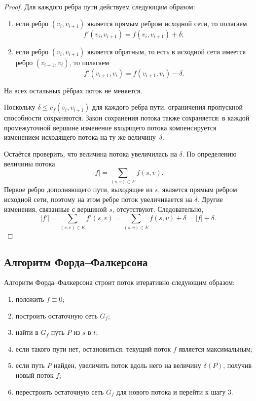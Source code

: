 \begin{proof}
	Для каждого ребра пути действуем следующим образом:
	\begin{enumerate}[label=\arabic*)]
		\item если ребро $(v_i,v_{i+1})$ является прямым ребром исходной сети, то полагаем
		\[
		f'(v_i,v_{i+1})=f(v_i,v_{i+1})+\delta;
		\]
		\item если ребро $(v_i,v_{i+1})$ является обратным, то есть в исходной сети имеется ребро $(v_{i+1},v_i)$, то полагаем
		\[
		f'(v_{i+1},v_i)=f(v_{i+1},v_i)-\delta.
		\]
	\end{enumerate}
	На всех остальных рёбрах поток не меняется.
	
	Поскольку $\delta \le c_f(v_i,v_{i+1})$ для каждого ребра пути, ограничения пропускной способности сохраняются. Закон сохранения потока также сохраняется: в каждой промежуточной вершине изменение входящего потока компенсируется изменением исходящего потока на ту же величину~$\delta$.
	
	Остаётся проверить, что величина потока увеличилась на $\delta$. По определению величины потока
	\[
	|f|=\sum_{(s,v)\in E} f(s,v).
	\]
	Первое ребро дополняющего пути, выходящее из $s$, является прямым ребром исходной сети, поэтому на этом ребре поток увеличивается на $\delta$. Другие изменения, связанные с вершиной $s$, отсутствуют. Следовательно,
	\[
	|f'|=\sum_{(s,v)\in E} f'(s,v)=\sum_{(s,v)\in E} f(s,v)+\delta=|f|+\delta.
	\]
\end{proof}

\subsection{Алгоритм Форда--Фалкерсона}

\begin{Statement}{}{}
	Алгоритм Форда--Фалкерсона строит поток итеративно следующим образом:
	\begin{enumerate}[label=\arabic*)]
		\item положить $f\equiv 0$;
		\item построить остаточную сеть $G_f$;
		\item найти в $G_f$ путь $P$ из $s$ в $t$;
		\item если такого пути нет, остановиться: текущий поток $f$ является максимальным;
		\item если путь $P$ найден, увеличить поток вдоль него на величину $\delta(P)$, получив новый поток $f$;
		\item перестроить остаточную сеть $G_f$ для нового потока и перейти к шагу 3.
	\end{enumerate}
\end{Statement}

